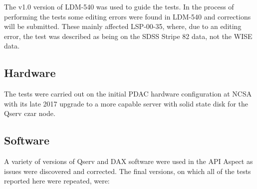 \documentclass[DM,toc]{lsstdoc}
\begin{document}
The v1.0 version of LDM-540 was used to guide the tests.
In the process of performing the tests some editing errors were found in LDM-540 and corrections will be submitted.
These mainly affected LSP-00-35, where, due to an editing error,
the test was described as being on the SDSS Stripe 82 data, not the WISE data.

\subsection{Hardware}

The tests were carried out on the initial PDAC hardware configuration at NCSA with its late 2017 upgrade to a more capable server with solid state disk for the Qserv czar node.

\subsection{Software}

A variety of versions of Qserv and DAX software were used in the API Aspect as issues were discovered and corrected.
The final versions, on which all of the tests reported here were repeated, were:
\end{document}
